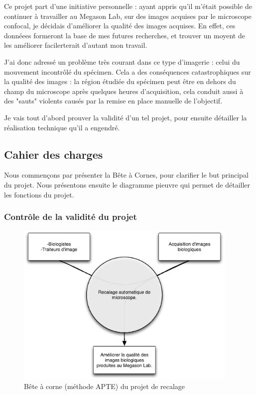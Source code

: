 Ce projet part d'une initiative personnelle : ayant appris qu'il m'était possible de continuer à travailler au Megason Lab, sur des images acquises par le microscope confocal, je décidais d'améliorer la qualité des images acquises. En effet, ces donnéees formeront la base de mes futures recherches, et trouver un moyent de les améliorer facilerterait d'autant mon travail.

J'ai donc adressé un problème très courant dans ce type d'imagerie : 
celui du mouvement incontrôlé du spécimen.
Cela a des conséquences catastrophiques sur la qualité des images : 
la région étudiée du spécimen peut être en dehors du champ du microscope après quelques heures d'acquisition,
cela conduit aussi à des "sauts" violents causés par la remise en place manuelle de l'objectif.

Je vais tout d'abord prouver la validité d'un tel projet, pour ensuite détailler la réalisation technique qu'il a engendré.
\subsection{Cahier des charges}
Nous commençons par présenter la Bête à Cornes,
pour clarifier le but principal du projet. Nous présentons ensuite le diagramme pieuvre qui permet de détailler les fonctions du projet.

\subsubsection{Contrôle de la validité du projet}
\begin{figure}[h]
\begin{center}
\leavevmode
\includegraphics[width=0.95\textwidth]{pictures/RecalBAC}
\end{center}
\caption{Bête à corne (méthode {APTE\textregistered}) du projet de recalage}
\label{fig:BACRecal}
\end{figure}

